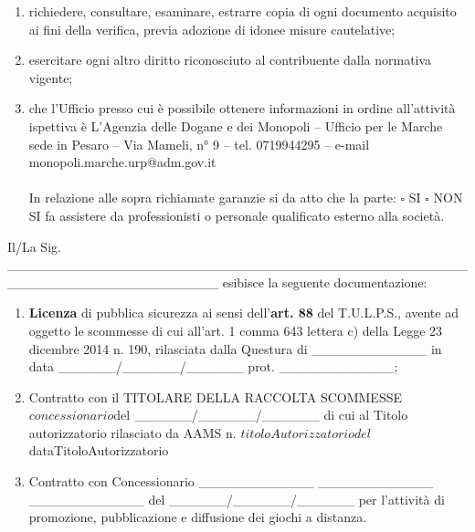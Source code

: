 \documentclass[12pt]{article}
\newcommand\concessionario{$concessionario$}
\newcommand\titoloAutorizzatorio{$titoloAutorizzatorio}
\newcommand\dataTitoloAutorizzatorio{$dataTitoloAutorizzatorio}
\begin{document}
\begin{enumerate}
\begin{enumerate}
        \item richiedere, consultare, esaminare, estrarre copia di ogni documento acquisito ai fini della verifica, previa adozione di idonee misure cautelative;
        \item esercitare ogni altro diritto riconosciuto al contribuente dalla normativa vigente;
        \item che l’Ufficio presso cui è possibile ottenere informazioni in ordine all’attività ispettiva è L’Agenzia delle Dogane e dei Monopoli – Ufficio per le Marche sede in Pesaro – Via Mameli, n° 9 – tel. 0719944295 – e-mail monopoli.marche.urp@adm.gov.it \\\\
        In relazione alle sopra richiamate garanzie si da atto che la parte:
        \begin{math}\square\end{math} SI \begin{math}\square\end{math} NON SI fa assistere da professionisti o personale qualificato esterno alla società.

    \end{enumerate}

\end{enumerate}

Il/La Sig. \_\_\_\_\_\_\_\_\_\_\_\_\_\_\_\_\_\_\_\_\_\_\_\_\_\_\_\_\_\_\_\_\_\_\_\_\_\_\_\_\_\_\_\_\_\_\_\_\_\_\_\_\_\_\_\_\_\_\_\_\_\_\_\_\_\_\_\_\_\_ esibisce la seguente documentazione:

\begin{enumerate}
    \item \textbf{Licenza} di pubblica sicurezza ai sensi dell’\textbf{art. 88} del T.U.L.P.S., avente ad oggetto le scommesse di cui all'art. 1 comma 643 lettera c) della Legge 23 dicembre 2014 n. 190,  rilasciata dalla Questura di \_\_\_\_\_\_\_\_\_\_\_\_ in data \_\_\_\_\_\_/\_\_\_\_\_\_/\_\_\_\_\_\_ prot. \_\_\_\_\_\_\_\_\_\_\_\_;
    \item Contratto con il TITOLARE DELLA RACCOLTA SCOMMESSE \concessionario del \_\_\_\_\_\_/\_\_\_\_\_\_/\_\_\_\_\_\_ di cui al Titolo autorizzatorio rilasciato da AAMS n. \titoloAutorizzatorio del \dataTitoloAutorizzatorio
    \item Contratto con Concessionario \_\_\_\_\_\_\_\_\_\_\_\_ \_\_\_\_\_\_\_\_\_\_\_\_ \_\_\_\_\_\_\_\_\_\_\_\_  del \_\_\_\_\_\_/\_\_\_\_\_\_/\_\_\_\_\_\_ per l'attività di promozione, pubblicazione e diffusione dei giochi a distanza.
\end{enumerate}
\end{document}
